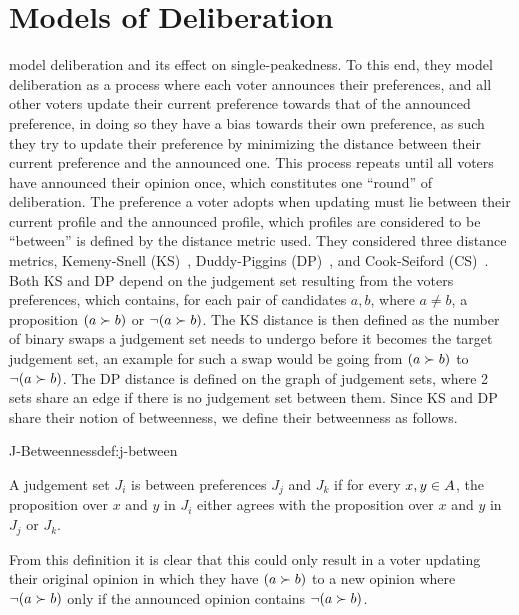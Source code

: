 \section{Models of Deliberation} \label{section:related_work} %
\citet{radDeliberationSinglePeakednessCoherent2021} model deliberation
and its effect on single-peakedness. To this end, they model deliberation as
a process where each voter announces their preferences, and all other voters
update their current preference towards that of the announced preference, in
doing so they have a bias towards their own preference, as such they try to
update their preference by minimizing the distance between their current
preference and the announced one. This process repeats until all voters have
announced their opinion once, which constitutes one ``round'' of deliberation.
The preference a voter adopts when updating must lie between their current
profile and the announced profile, which profiles are considered to be
``between'' is defined by the distance metric used. They considered three
distance metrics, Kemeny-Snell (KS)~\citep{kemeny1962preference}, Duddy-Piggins
(DP)~\citep{duddyMeasureDistanceJudgment2012}, and Cook-Seiford
(CS)~\citep{cookPriorityRankingConsensus1978}. Both KS and DP depend on the
judgement set resulting from the voters preferences, which contains, for
each pair of candidates $a,b$, where $a \neq b$, a proposition $(a \succ b)$ or
$\neg (a \succ b)$. The KS distance is then defined as the number of binary
swaps a judgement set needs to undergo before it becomes the target judgement
set, an example for such a swap would be going from $(a \succ b)$ to $\neg (a
	\succ b)$. The DP distance is defined on the graph of judgement sets, where 2
sets share an edge if there is no judgement set between them. Since KS and DP
share their notion of betweenness, we define their betweenness as follows.

\begin{definition}{J-Betweenness}{def:j-between}

	A judgement set $J_i$ is between preferences $J_j$ and $J_k$ if for
	every $x,y \in A$, the proposition over $x$ and $y$ in
	$J_i$ either agrees with the proposition over $x$ and $y$ in $J_j$ or $J_k$.

\end{definition}

From this definition it is clear that this could only result in a voter
updating their original opinion in which they have $(a \succ b)$ to a new
opinion where $\neg (a\succ b)$ only if the announced opinion contains $\neg (a
	\succ b)$.


